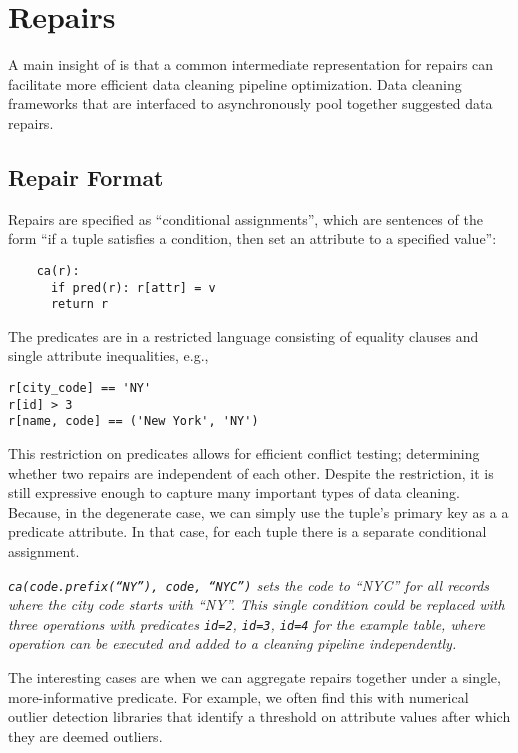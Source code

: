 \section{Repairs}\label{s:problem}
A main insight of \sys is that a common intermediate representation for repairs can facilitate more efficient data cleaning pipeline optimization.
Data cleaning frameworks that are interfaced to \sys asynchronously pool together suggested data repairs.

\subsection{Repair Format}
Repairs are specified as ``conditional assignments'', which are sentences of the form ``if a tuple satisfies a condition, then set an attribute to a specified value'': 
{\small\begin{verbatim}
    ca(r):
      if pred(r): r[attr] = v
      return r
\end{verbatim}
}
The predicates are in a restricted language consisting of equality clauses and single attribute inequalities, e.g., 
{\small\begin{verbatim}
r[city_code] == 'NY'     
r[id] > 3      
r[name, code] == ('New York', 'NY')
\end{verbatim}
}
This restriction on predicates allows for efficient conflict testing; determining whether two repairs are independent of each other. 
Despite the restriction, it is still expressive enough to capture many important types of data cleaning. Because, in the degenerate case, we can simply use the tuple's primary key as a a predicate attribute. In that case, for each tuple there is a separate conditional assignment. 

\begin{example}\it
  \texttt{ca(code.prefix(``NY''), code, ``NYC'')} sets the code to ``NYC'' for all records where the city code starts with ``NY''.  This single condition could be replaced with three operations with predicates  \texttt{id=2}, \texttt{id=3}, \texttt{id=4} {\it for the example table}, where operation can be executed and added to a cleaning pipeline independently. 
 \end{example}
 
 The interesting cases are when we can aggregate repairs together under a single, more-informative predicate. For example, we often find this with numerical outlier detection libraries that identify a threshold on attribute values after which they are deemed outliers.
 
